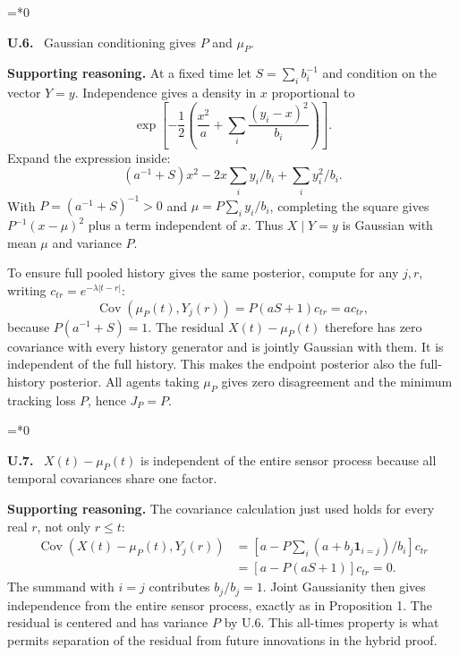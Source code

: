 \documentclass[12pt,letterpaper]{article}
\newcommand{\Cov}{\operatorname{Cov}}
\newenvironment{proofstep}[2]{%
  \begin{list}{}{\leftmargin=\dimexpr 0.17in*#2\relax%
  \setlength{\rightmargin}{0pt}\setlength{\topsep}{5pt}\setlength{\parsep}{2pt}}%
  \item[]\textbf{\textcolor{ink}{#1.}}\ }{\end{list}}
\begin{document}
\begin{proofstep}{U.6}{0}
\label{step:U.6}
Gaussian conditioning gives $P$ and $\mu_P$.

\textbf{Supporting reasoning.}
At a fixed time let $S=\sum_i b_i^{-1}$ and condition on the vector $Y=y$. Independence gives a density in $x$ proportional to
\[
\exp\left[-\frac12\left(\frac{x^2}{a}+\sum_i\frac{(y_i-x)^2}{b_i}\right)\right].
\]
Expand the expression inside:
\[
(a^{-1}+S)x^2-2x\sum_i y_i/b_i+\sum_i y_i^2/b_i.
\]
With $P=(a^{-1}+S)^{-1}>0$ and $\mu=P\sum_i y_i/b_i$, completing the square gives $P^{-1}(x-\mu)^2$ plus a term independent of $x$. Thus $X\mid Y=y$ is Gaussian with mean $\mu$ and variance $P$.

To ensure full pooled history gives the same posterior, compute for any $j,r$, writing $c_{tr}=e^{-\lambda|t-r|}$:
\[
\Cov(\mu_P(t),Y_j(r))=P(aS+1)c_{tr}=a c_{tr},
\]
because $P(a^{-1}+S)=1$. The residual $X(t)-\mu_P(t)$ therefore has zero covariance with every history generator and is jointly Gaussian with them. It is independent of the full history. This makes the endpoint posterior also the full-history posterior. All agents taking $\mu_P$ gives zero disagreement and the minimum tracking loss $P$, hence $J_P=P$.
\par{}
\end{proofstep}

\begin{proofstep}{U.7}{0}
\label{step:U.7}
$X(t)-\mu_P(t)$ is independent of the entire sensor process because all temporal covariances share one factor.

\textbf{Supporting reasoning.}
The covariance calculation just used holds for every real $r$, not only $r\le t$:
\begin{align*}
\Cov(X(t)-\mu_P(t),Y_j(r))
&=[a-P\sum_i(a+b_j\mathbf1_{i=j})/b_i]c_{tr}\\
&=[a-P(aS+1)]c_{tr}=0.
\end{align*}
The summand with $i=j$ contributes $b_j/b_j=1$. Joint Gaussianity then gives independence from the entire sensor process, exactly as in Proposition 1. The residual is centered and has variance $P$ by U.6. This all-times property is what permits separation of the residual from future innovations in the hybrid proof.
\par{}
\end{proofstep}
\end{document}
